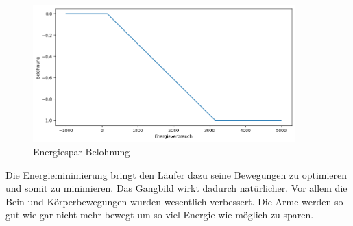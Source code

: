 \begin{figure}[H]
  \centering
  \includegraphics[width=0.9\textwidth]{img/plot_energiespar} 
  \caption{Energiespar Belohnung}
  \label{fig:plot_energiespar}
\end{figure}

Die Energieminimierung bringt den Läufer dazu seine Bewegungen zu optimieren und somit zu minimieren. Das Gangbild wirkt dadurch natürlicher. Vor allem die Bein und Körperbewegungen wurden wesentlich verbessert. Die Arme werden so gut wie gar nicht mehr bewegt um so viel Energie wie möglich zu sparen.

